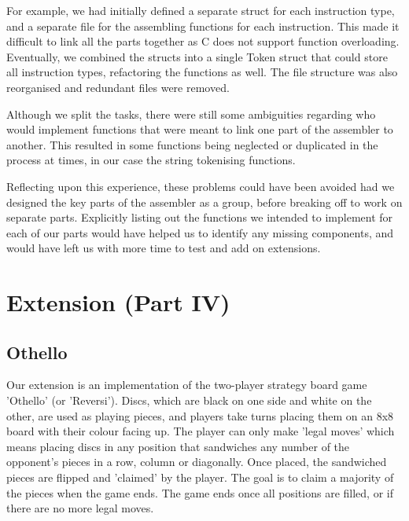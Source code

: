 \documentclass[a4paper,11pt]{article}
\begin{document}
For example, we had initially defined a separate struct for each instruction type, and a separate file for the assembling functions for each instruction. This made it difficult to link all the parts together as C does not support function overloading. Eventually, we combined the structs into a single Token struct that could store all instruction types, refactoring the functions as well. The file structure was also reorganised and redundant files were removed.

Although we split the tasks, there were still some ambiguities regarding who would implement functions that were meant to link one part of the assembler to another. This resulted in some functions being neglected or duplicated in the process at times, in our case the string tokenising functions.

Reflecting upon this experience, these problems could have been avoided had we designed the key parts of the assembler as a group, before breaking off to work on separate parts. Explicitly listing out the functions we intended to implement for each of our parts would have helped us to identify any missing components, and would have left us with more time to test and add on extensions.

\section{Extension (Part IV)}

\subsection{Othello}
Our extension is an implementation of the two-player strategy board game 'Othello' (or 'Reversi'). Discs, which are black on one side and white on the other, are used as playing pieces, and players take turns placing them on an 8x8 board with their colour facing up. The player can only make 'legal moves' which means placing discs in any position that sandwiches any number of the opponent's pieces in a row, column or diagonally. Once placed, the sandwiched pieces are flipped and 'claimed' by the player. The goal is to claim a majority of the pieces when the game ends. The game ends once all positions are filled, or if there are no more legal moves.
\end{document}

